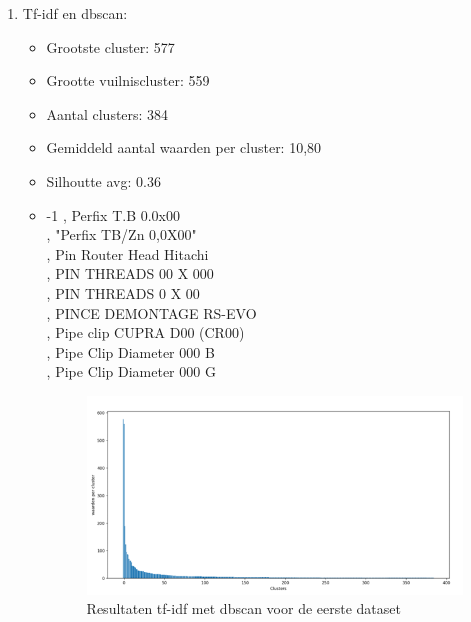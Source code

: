 \begin{enumerate}
\item Tf-idf en dbscan:
\begin{itemize}
    \item Grootste cluster: 577
    \item Grootte vuilniscluster: 559
    \item Aantal clusters: 384
    \item Gemiddeld aantal waarden per cluster: 10,80
    \item Silhoutte avg: 0.36
    \item
    -1 , Perfix T.B 0.0x00
    \\ , "Perfix TB/Zn 0,0X00"
    \\ , Pin Router Head Hitachi
    \\ , PIN THREADS 00 X 000
    \\ , PIN THREADS 0 X 00
    \\ , PINCE DEMONTAGE RS-EVO
    \\ , Pipe clip CUPRA D00 (CR00)
    \\ , Pipe Clip Diameter 000  B
    \\ , Pipe Clip Diameter 000  G
    \begin{figure}[h]
        \centering
        \includegraphics[width=0.7\linewidth]{../foto's/datatfidfdbscan}
        \caption{Resultaten tf-idf met dbscan voor de eerste dataset}
        \label{fig:dataset1_tf-idf_dbscan}
    \end{figure}
\end{itemize}
\newpage


\end{enumerate}
